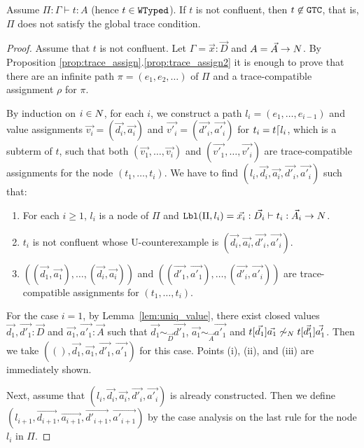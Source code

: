 \begin{theorem}
  Assume $\Pi:\Gamma\vdash t:A$ (hence $t \in {\tt WTyped}$). 
  If $t$ is not confluent,
  then $t \not\in {\tt GTC}$, that is, $\Pi$ does not satisfy the global trace condition. 
\end{theorem}
\begin{proof}
  Assume that $t$ is not confluent. 
  Let $\Gamma = \vec{x}:\vec{D}$ and $A = \vec{A}\rightarrow{N}$. 
  By Proposition \ref{prop:trace_assign}.\ref{prop:trace_assign2} it is enough to prove that
  there are an infinite path $\pi=(e_1, e_2, \ldots)$ of $\Pi$
  and a trace-compatible assignment $\rho$ for $\pi$.
  
  By induction on $i \in {N}$, for each $i$, we construct a path $l_i = (e_1,\ldots,e_{i-1})$
  and value assignments $\vec{v_i} = (\vec{d_i},\vec{a_i})$ and $\vec{v'_i} = (\vec{d'_i},\vec{a'_i})$
  for $t_i = t {\lceil} l_i$, which is a subterm of $t$, such that 
  both $(\vec{v_1},\ldots,\vec{v_i})$ and $(\vec{v'_1},\ldots,\vec{v'_i})$ are
  trace-compatible assignments for the node $(t_1, \ldots, t_i)$.
  We have to find $(l_i,\vec{d_i},\vec{a_i},\vec{d'_i},\vec{a'_i})$ such that:
  \begin{enumerate}
  \item[(i)]
    For each $i\ge 1$, $l_i$ is a node of $\Pi$ and
    ${\tt Lbl}(\Pi,l_i) = \vec{x_i}:\vec{D_i}\vdash t_i:\vec{A_i}\rightarrow{N}$. 
  \item[(ii)]
    $t_i$ is not confluent whose U-counterexample is $(\vec{d_i},\vec{a_i},\vec{d'_i},\vec{a'_i})$. 
  \item[(iii)]
    $((\vec{d_1},\vec{a_1}),\ldots,(\vec{d_i},\vec{a_i}))$ and
    $((\vec{d'_1},\vec{a'_1}),\ldots,(\vec{d'_i},\vec{a'_i}))$ are trace-compatible assignments for
    $(t_1,\ldots,t_i)$. 
  \end{enumerate}

  For the case $i=1$,
  by Lemma~\ref{lem:uniq_value},
  there exist closed values $\vec{d_1},\vec{d'_1}:\vec{D}$ and $\vec{a_1},\vec{a'_1}:\vec{A}$ such that
  $\vec{d_1}\sim_{\vec{D}}\vec{d'_1}$, $\vec{a_1}\sim_{\vec{A}}\vec{a'_1}$ and 
  $t[\vec{d_1}]\vec{a_1} \not\sim_{{N}} t[\vec{d'_1}]\vec{a'_1}$. 
  Then we take $((),\vec{d_1},\vec{a_1},\vec{d'_1},\vec{a'_1})$ for this case.
  Points (i), (ii), and (iii) are immediately shown. 

  Next, assume that $(l_i,\vec{d_i},\vec{a_i},\vec{d'_i},\vec{a'_i})$ is already constructed. 
  Then we define $(l_{i+1},\vec{d_{i+1}},\vec{a_{i+1}},\vec{d'_{i+1}},\vec{a'_{i+1}})$ by the case analysis
  on the last rule for the node $l_i$ in $\Pi$. 


\end{proof}
